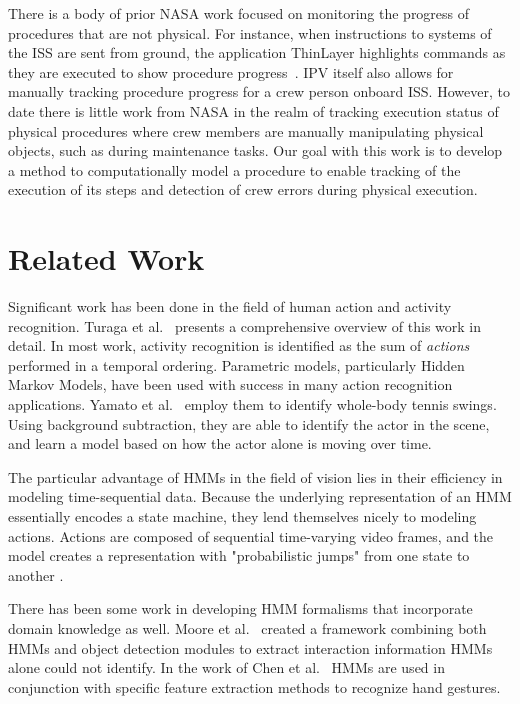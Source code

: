 \documentclass[10pt,twocolumn,letterpaper]{article}
\begin{document}
There is a body of prior NASA work focused on monitoring the progress of procedures that are not physical. For instance, when instructions to systems of the ISS are sent from ground, the application ThinLayer highlights commands as they are executed to show procedure progress~\cite{frank2010plans}. IPV itself also allows for manually tracking procedure progress for a crew person onboard ISS. However, to date there is little work from NASA in the realm of tracking execution status of physical procedures where crew members are manually manipulating physical objects, such as during maintenance tasks. Our goal with this work is to develop a method to computationally model a procedure to enable tracking of the execution of its steps and detection of crew errors during physical execution.


\section{Related Work}

Significant work has been done in the field of human action and activity recognition. Turaga et al.~\cite{turaga2008machine} presents a comprehensive overview of this work in detail. In most work, activity recognition is identified as the sum of \emph{actions} performed in a temporal ordering. Parametric models, particularly Hidden Markov Models, have been used with success in many action recognition applications. Yamato et al.~\cite{yamato1992recognizing} employ them to identify whole-body tennis swings. Using background subtraction, they are able to identify the actor in the scene, and learn a model based on how the actor alone is moving over time.

The particular advantage of HMMs in the field of vision lies in their efficiency in modeling time-sequential data. Because the underlying representation of an HMM essentially encodes a state machine, they lend themselves nicely to modeling actions. Actions are composed of sequential time-varying video frames, and the model creates a representation with "probabilistic jumps" from one state to another \cite{turaga2008machine}.

There has been some work in developing HMM formalisms that incorporate domain knowledge as well. Moore et al.~\cite{moore1999exploiting} created a framework combining both HMMs and object detection modules to extract interaction information HMMs alone could not identify. In the work of Chen et al.~\cite{chen2003hand} HMMs are used in conjunction with specific feature extraction methods to recognize hand gestures.
\end{document}
